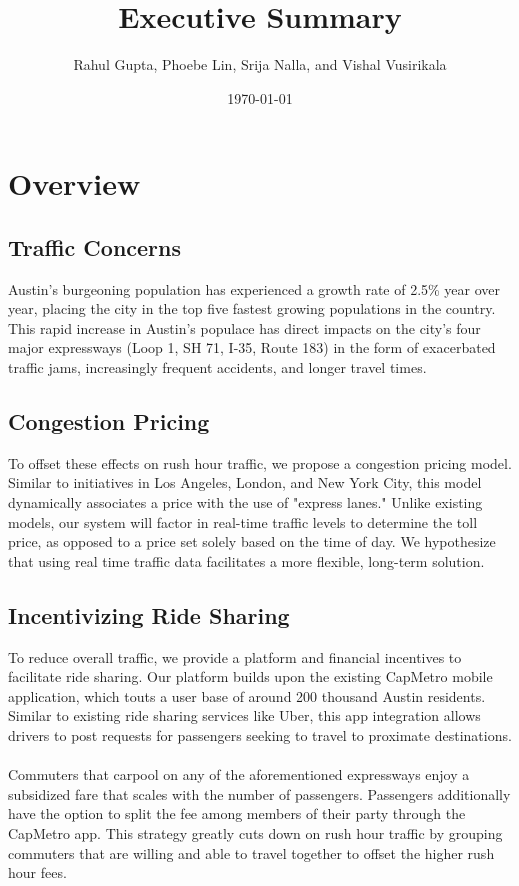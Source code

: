 \documentclass[7pt]{article}
\title{Executive Summary}
\author{Rahul Gupta, Phoebe Lin, Srija Nalla, and Vishal Vusirikala}
\date{\today}
\begin{document}
\maketitle
\section{Overview}
\subsection{Traffic Concerns}
Austin's burgeoning population has experienced a growth rate of 2.5\% year over year, placing the city in the top five fastest growing populations in the country. This rapid increase in Austin's populace has direct impacts on the city's four major expressways (Loop 1, SH 71, I-35, Route 183) in the form of exacerbated traffic jams, increasingly frequent accidents, and longer travel times. 

\subsection{Congestion Pricing}
To offset these effects on rush hour traffic, we propose a congestion pricing model. Similar to initiatives in Los Angeles, London, and New York City, this model dynamically associates a price with the use of "express lanes." Unlike existing models, our system will factor in real-time traffic levels to determine the toll price, as opposed to a price set solely based on the time of day. We hypothesize that using real time traffic data facilitates a more flexible, long-term solution.
 
\subsection{Incentivizing Ride Sharing}
To reduce overall traffic, we provide a platform and financial incentives to facilitate ride sharing. Our platform builds upon the existing CapMetro mobile application, which touts a user base of around 200 thousand Austin residents. Similar to existing ride sharing services like Uber, this app integration allows drivers to post requests for passengers seeking to travel to proximate destinations. \\\\
Commuters that carpool on any of the aforementioned expressways enjoy a subsidized fare that scales with the number of passengers. Passengers additionally have the option to split the fee among members of their party through the CapMetro app. This strategy greatly cuts down on rush hour traffic by grouping commuters that are willing and able to travel together to offset the higher rush hour fees.
\end{document}
